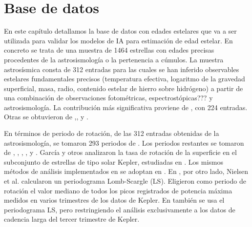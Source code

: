 \chapter{Base de datos}
\label{sec:data}
En este capítulo detallamos la base de datos con edades estelares que va a ser utilizada para validar los modelos de IA para estimación de edad estelar.
En concreto se trata de una muestra de 1464 estrellas con edades precisas procedentes de la astrosismología o la pertenencia a cúmulos. La muestra astrosísmica consta de 312 entradas para las cuales se han inferido observables estelares fundamentales precisos (temperatura efectiva, logaritmo de la gravedad superficial, masa, radio, contenido estelar de hierro sobre hidrógeno) a partir de una combinación de observaciones fotométricas, espectrostópicas???%
y astrosismología. La contribución más significativa proviene de \cite{Serenelli17}, con 224 entradas. Otras se obtuvieron de \cite{Ceillier16},\cite{Garcia14},\cite{Silva15} y \cite{Silva17}.

\begin{table}[H]
\centering
\centering
{}
\caption{Características proporcionadas en la base de datos para cada estrella.}\label{table:data}
\end{table}

En términos de periodo de rotación, de las 312 entradas obtenidas de la astrosismología, se tomaron 293 periodos de \cite{Garcia14}. Los periodos restantes se tomaron de \cite{Ceillier16}, \cite{Mazeh15}, \cite{McQuillan13a}, \cite{McQuillan14}, \cite{Nielsen13} y \cite{Reinhold13}. García y otros \cite{Garcia14} analizaron la tasa de rotación de la superficie en el subconjunto de estrellas de tipo solar Kepler, estudiadas en \cite{Garcia14}. Los mismos métodos de análisis implementados en \cite{Garcia14} se adoptan en \cite{Ceillier16}. En \cite{Nielsen13}, por otro lado, Nielsen et al. calcularon un periodograma Lomb-Scargle (LS). Eligieron como periodo de rotación el valor mediano de todos los picos registrados de potencia máxima medidos en varios trimestres de los datos de Kepler. En \cite{Reinhold13} también se usa el periodograma LS, pero restringiendo el análisis exclusivamente a los datos de cadencia larga del tercer trimestre de Kepler.

